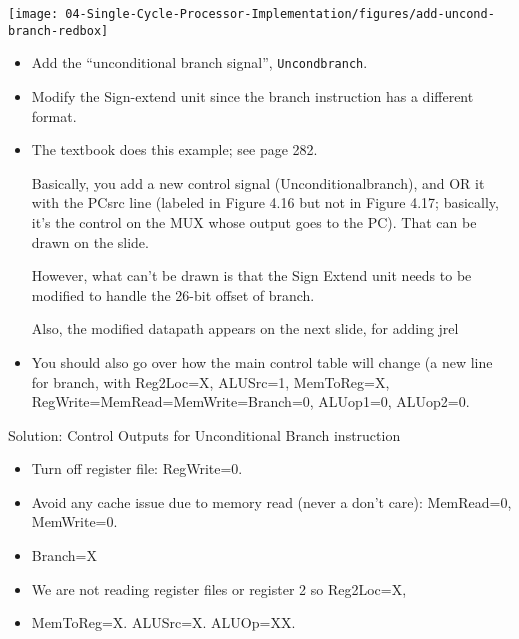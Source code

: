 \begin{frame}[fragile]
\texttt{[image: 04-Single-Cycle-Processor-Implementation/figures/add-uncond-branch-redbox]}
{\small
\begin{itemize}
    \item Add the ``unconditional branch signal'', \texttt{Uncondbranch}.
\item Modify the Sign-extend unit since the branch instruction has a different format.
\end{itemize}}
\BNotes\ifnum{}
\begin{itemize}
\item The textbook does this example; see page 282.

  Basically, you add a new control signal (Unconditionalbranch),
  and OR it with the PCsrc line (labeled in Figure 4.16 but not in Figure 4.17; basically, it's the control on the MUX whose output goes to the PC).
  That can be drawn on the slide.

  However, what can't be drawn is that the Sign Extend unit needs to be
  modified to handle the 26-bit offset of branch.

  Also, the modified datapath appears on the next slide, for adding jrel
  
\item You should also go over how the main control table will change
  (a new line for branch, with Reg2Loc=X, ALUSrc=1, MemToReg=X, RegWrite=MemRead=MemWrite=Branch=0, ALUop1=0, ALUop2=0.
  
\end{itemize}
\fi\ENotes
\end{frame}

\begin{frame}{Solution: Control Outputs for Unconditional Branch instruction}
\begin{itemize}
    \item Turn off register file: RegWrite=0. 
    \item Avoid any cache issue due to memory read (never a don't care): MemRead=0, MemWrite=0.
    \item Branch=X 
    \item We are not reading register files or register 2 so Reg2Loc=X, 
    \item MemToReg=X. ALUSrc=X. ALUOp=XX.
\end{itemize}
    
\end{frame}



